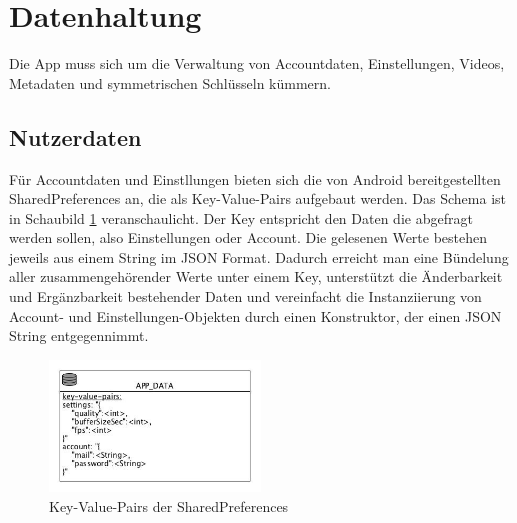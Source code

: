 \section{Datenhaltung}
Die App muss sich um die Verwaltung von Accountdaten, Einstellungen, Videos, Metadaten und symmetrischen Schlüsseln kümmern. 

\subsection{Nutzerdaten}
Für Accountdaten und  Einstllungen bieten sich die von Android bereitgestellten SharedPreferences an, die als Key-Value-Pairs aufgebaut werden. Das Schema ist in Schaubild \ref{fig:sharedpreferences_overview} veranschaulicht. Der Key entspricht den Daten die abgefragt werden sollen, also Einstellungen oder Account. Die gelesenen Werte bestehen jeweils aus einem String im JSON Format. Dadurch erreicht man eine Bündelung aller zusammengehörender Werte unter einem Key, unterstützt die Änderbarkeit und Ergänzbarkeit bestehender Daten und vereinfacht die Instanziierung von Account- und Einstellungen-Objekten durch einen Konstruktor, der einen JSON String entgegennimmt.\newline\par

\begin{figure}[ht]
	\centering
\includegraphics[width=0.5\textwidth]{./resources/Diagramme/App/sharedpreferences_overview.jpg}
\caption{Key-Value-Pairs der SharedPreferences}
	\label{fig:sharedpreferences_overview}
\end{figure}

